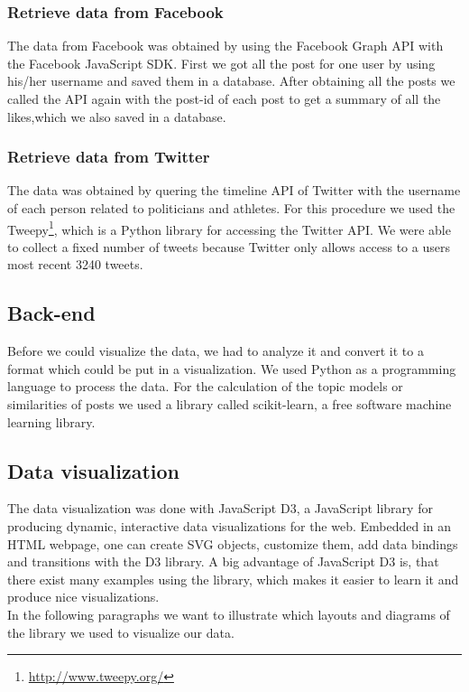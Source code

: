 \subsubsection{Retrieve data from Facebook}
The data from Facebook was obtained by using the Facebook Graph API with the Facebook JavaScript SDK. First we got all the post for one user by using his/her username and saved them in a database. After obtaining all the posts we called the API again with the post-id of each post to get a summary of all the likes,which we also saved in a database.

\subsubsection{Retrieve data from Twitter}

The data was obtained by quering the timeline API of Twitter with the username of each person related to politicians and athletes. For this procedure we used the Tweepy\footnote{\url{http://www.tweepy.org/}}, which is a Python library for accessing the Twitter API. We were able to collect a fixed number of tweets because Twitter only allows access to a users most recent 3240 tweets.  

\subsection{Back-end}
Before we could visualize the data, we had to analyze it and convert it to a format which could be put in a visualization. We used Python as a programming language to process the data. For the calculation of the topic models or similarities of posts we used a library called scikit-learn, a free software machine learning library.   

\subsection{Data visualization}
The data visualization was done  with JavaScript D3, a JavaScript library for producing dynamic, interactive data visualizations for the web. Embedded in an HTML webpage, one can create SVG objects, customize them, add data bindings and transitions  with the D3 library. A big advantage of JavaScript D3 is, that there exist many examples using the library, which makes it easier to learn it and produce nice visualizations. \\
In the following paragraphs we want to illustrate which layouts and diagrams of the library we used to visualize our data. 


